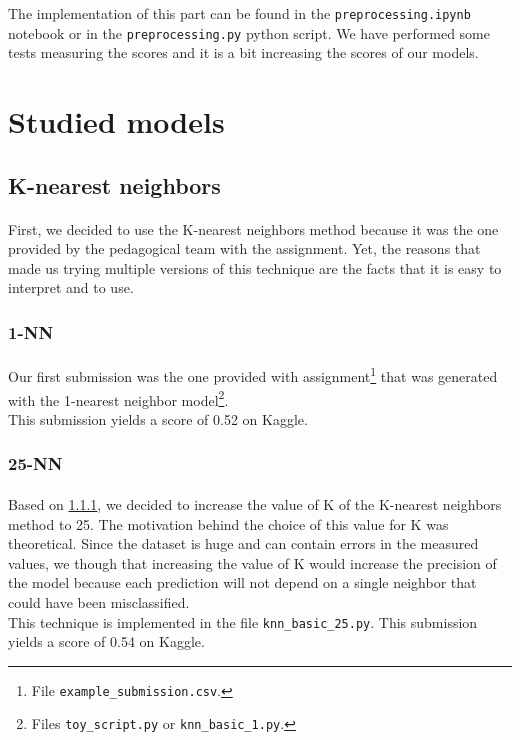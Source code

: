 \documentclass[a4paper, 11pt, oneside]{article}
\begin{document}
The implementation of this part can be found in the \texttt{preprocessing.ipynb} notebook or in the \texttt{preprocessing.py} python script. We have performed some tests measuring the scores and it is a bit increasing the scores of our models.


\section{Studied models}


\subsection{K-nearest neighbors}
\paragraph{}First, we decided to use the K-nearest neighbors method because it was the one provided by the pedagogical team with the assignment. Yet, the reasons that made us trying multiple versions of this technique are the facts that it is easy to interpret and to use.

\subsubsection{1-NN} \label{subsec:1NN}
\paragraph{}Our first submission was the one provided with assignment\footnote{File \texttt{example\_submission.csv}.} that was generated with the 1-nearest neighbor model\footnote{Files \texttt{toy\_script.py} or \texttt{knn\_basic\_1.py}.}.\\
This submission yields a score of 0.52 on Kaggle.

\subsubsection{25-NN}
\paragraph{}Based on \ref{subsec:1NN}, we decided to increase the value of K of the K-nearest neighbors method to 25. The motivation behind the choice of this value for K was theoretical. Since the dataset is huge and can contain errors in the measured values, we though that increasing the value of K would increase the precision of the model because each prediction will not depend on a single neighbor that could have been misclassified.\\
This technique is implemented in the file \texttt{knn\_basic\_25.py}. This submission yields a score of 0.54 on Kaggle.
\end{document}
